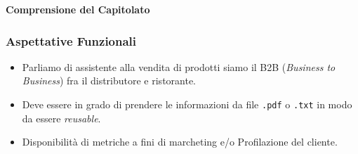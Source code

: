 \documentclass{beamer}
\begin{document}




\begin{frame}
    \centering
    \vspace*{2cm}
    {\Huge \textbf{Comprensione del Capitolato}}
    \vspace*{2cm}
\end{frame}

\begin{frame}
    \frametitle{Aspettative Funzionali}
            \begin{itemize}
                \item Parliamo di assistente alla vendita di prodotti siamo il B2B (\textit{Business to Business}) fra il distributore e ristorante.
                \item Deve essere in grado di prendere le informazioni da file \texttt{.pdf} o \texttt{.txt} in modo da essere \textit{reusable}.
                \item Disponibilità di metriche a fini di marcheting e/o Profilazione del cliente.
            \end{itemize}
\end{frame}
\end{document}
